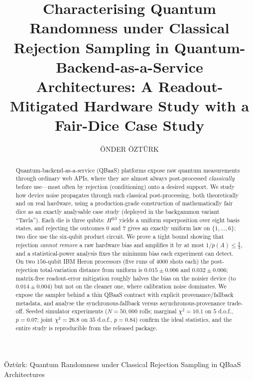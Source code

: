 \documentclass{ieeeaccess}
\begin{document}

\title{Characterising Quantum Randomness under Classical Rejection Sampling in Quantum-Backend-as-a-Service Architectures: A Readout-Mitigated Hardware Study with a Fair-Dice Case Study}

\author{ÖNDER ÖZTÜRK}
\address[1]{Information Technology Department, Rectorate, Kütahya Health Sciences University, Türkiye (e-mail: onder.ozturk@ksbu.edu.tr; ORCID: https://orcid.org/0000-0001-6460-9497)}

{Öztürk: Quantum Randomness under Classical Rejection Sampling in QBaaS Architectures}


\begin{abstract}
Quantum-backend-as-a-service (QBaaS) platforms expose raw quantum measurements through ordinary web APIs, where they are almost always post-processed \emph{classically} before use---most often by rejection (conditioning) onto a desired support. We study how device noise propagates through such classical post-processing, both theoretically and on real hardware, using a production-grade construction of mathematically fair dice as an exactly analysable case study (deployed in the backgammon variant ``Tavla''). Each die is three qubits: $H^{\otimes 3}$ yields a uniform superposition over eight basis states, and rejecting the outcomes $0$ and $7$ gives an exactly uniform law on $\{1,\dots,6\}$; two dice use the six-qubit product circuit. We prove a tight bound showing that rejection \emph{cannot remove} a raw hardware bias and amplifies it by at most $1/p(A)\le\tfrac43$, and a statistical-power analysis fixes the minimum bias each experiment can detect. On two $156$-qubit IBM Heron processors (five runs of $4000$ shots each) the post-rejection total-variation distance from uniform is $0.015\pm0.006$ and $0.032\pm0.006$; matrix-free readout-error mitigation roughly halves the bias on the noisier device (to $0.014\pm0.004$) but not on the cleaner one, where calibration noise dominates. We expose the sampler behind a thin QBaaS contract with explicit provenance/fallback metadata, and analyse the synchronous-fallback versus asynchronous-provenance trade-off. Seeded simulator experiments ($N=50{,}000$ rolls; marginal $\chi^2=10.1$ on $5$ d.o.f., $p=0.07$; joint $\chi^2=26.8$ on $35$ d.o.f., $p=0.84$) confirm the ideal statistics, and the entire study is reproducible from the released package.
\end{abstract}
\end{document}

